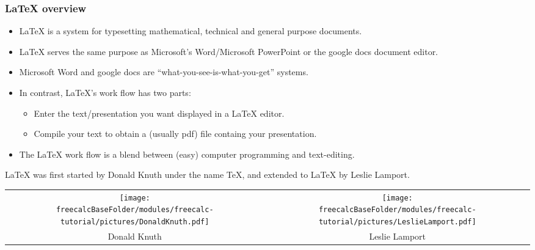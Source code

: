 \begin{frame}
\frametitle{\LaTeX{} overview}
\begin{itemize}
\item \LaTeX{} is a system for typesetting mathematical, technical and general purpose documents. 
\item \LaTeX{} serves the same purpose as Microsoft's Word/Microsoft PowerPoint or the google docs document editor.
\item Microsoft Word and google docs are ``what-you-see-is-what-you-get'' systems.
\item In contrast, \LaTeX's work flow has two parts: 
\begin{itemize}
\item Enter the text/presentation you want displayed in a \LaTeX{} editor.
\item Compile your text to obtain a (usually pdf) file containg your presentation.
\end{itemize}
\item The \LaTeX{} work flow is a blend between (easy) computer programming and text-editing.
\end{itemize}
\end{frame}

\begin{frame}
\LaTeX{} was first started by Donald Knuth under the name \TeX,
and extended to \LaTeX{} by Leslie Lamport. 

\hfil\hfil
\begin{tabular}{cc}
\texttt{[image: \\freecalcBaseFolder/modules/freecalc-tutorial/pictures/DonaldKnuth.pdf]} & \texttt{[image: \\freecalcBaseFolder/modules/freecalc-tutorial/pictures/LeslieLamport.pdf]} \\
Donald Knuth & Leslie Lamport
\end{tabular}

\end{frame}